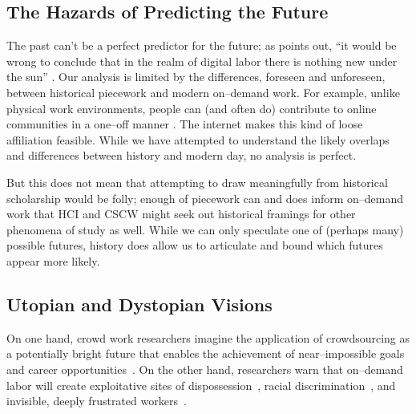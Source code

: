 \documentclass[trackingWork]{subfiles}
\begin{document}
\subsection{The Hazards of Predicting the Future}\label{sec:perilousProblemsPredicting}
The past can't be a perfect predictor for the future;
as \citeauthor{scholz2012digital} points out,
``it would be wrong to conclude that
in the realm of digital labor
there is nothing new under the sun''
\cite{scholz2012digital}.
Our analysis is limited by the differences, foreseen and unforeseen, between historical piecework and modern on--demand work.
For example, unlike physical work environments, people can (and often do) contribute to online communities in a one--off manner
\cite{mcinnis2016one}.
The internet makes this kind of loose affiliation feasible.
While we have attempted to understand the likely overlaps and differences between history and modern day, no analysis is perfect.


But this does not mean that
attempting to draw meaningfully from historical scholarship would be folly;
enough of piecework can and does inform on--demand work that
HCI and CSCW might seek out historical framings for other phenomena of study as well.
While we can only speculate one of (perhaps many) possible futures, history does allow us to articulate and bound which futures appear more likely.




\subsection{Utopian and Dystopian Visions}\label{sec:polarizationOfCrowdWork}
On one hand, crowd work researchers
imagine the application of crowdsourcing as
a potentially bright future that enables the achievement of near--impossible goals and career opportunities~\cite{redballoon,crowdworkFuture,vizwiz,suzukiAtelier}.
On the other hand, researchers
warn that on--demand labor will create exploitative sites of dispossession~\cite{scholz2012digital},
racial discrimination~\cite{edelman2015racial},
and invisible, deeply frustrated workers~\cite{turkopticon,bighamHalfWorkday}.
\end{document}
